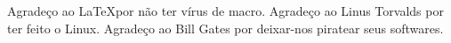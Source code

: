 \begin{agradecimentos}
Agradeço ao \LaTeX por não ter vírus de macro.
Agradeço ao Linus Torvalds por ter feito o Linux.
Agradeço ao Bill Gates por deixar-nos piratear seus softwares.
\end{agradecimentos}